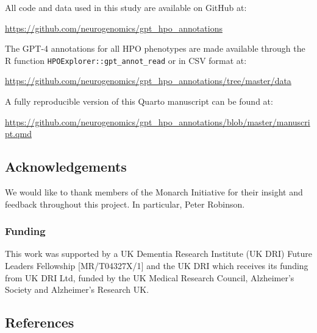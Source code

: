 \documentclass[
]{agujournal2019}
\begin{document}
All code and data used in this study are available on GitHub at:

\url{https://github.com/neurogenomics/gpt_hpo_annotations}

The GPT-4 annotations for all HPO phenotypes are made available through
the R function \texttt{HPOExplorer::gpt\_annot\_read} or in CSV format
at:

\url{https://github.com/neurogenomics/gpt_hpo_annotations/tree/master/data}

A fully reproducible version of this Quarto manuscript can be found at:

\url{https://github.com/neurogenomics/gpt_hpo_annotations/blob/master/manuscript.qmd}

\subsection{Acknowledgements}\label{acknowledgements}

We would like to thank members of the Monarch Initiative for their
insight and feedback throughout this project. In particular, Peter
Robinson.

\subsubsection{Funding}\label{funding}

This work was supported by a UK Dementia Research Institute (UK DRI)
Future Leaders Fellowship {[}MR/T04327X/1{]} and the UK DRI which
receives its funding from UK DRI Ltd, funded by the UK Medical Research
Council, Alzheimer's Society and Alzheimer's Research UK.

\subsection*{References}\label{references}
\end{document}

